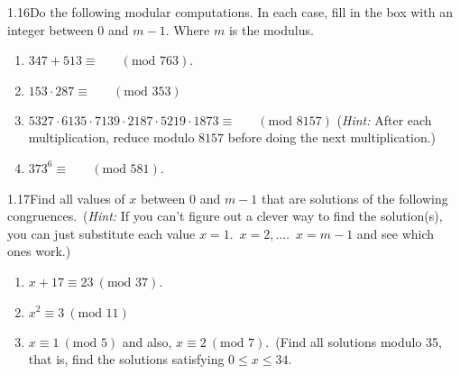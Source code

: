 \begin{exercise}
    {1.16}Do the following modular computations. In each case, fill in the box with an integer between 0 and \(m - 1\). Where \(m\) is the modulus.
    \begin{enumerate}
        \item \(347 + 513 \equiv \boxed{\phantom{000}} \ (\text{mod } 763)\).
        \setcounter{enumi}{2}
        \item \(153 \cdot 287 \equiv \boxed{\phantom{000}} \ (\text{mod } 353)\)
        \setcounter{enumi}{4}
        \item \(5327 \cdot 6135 \cdot 7139 \cdot 2187 \cdot 5219 \cdot 1873 \equiv \boxed{\phantom{000}} \ (\text{mod } 8157)\) (\textit{Hint:} After each multiplication, reduce modulo \(8157\) before doing the next multiplication.)
        \setcounter{enumi}{6}
        \item \(373^6 \equiv \boxed{\phantom{000}} \ (\text{mod } 581)\).
    \end{enumerate}
\end{exercise}


\begin{exercise}
    {1.17}Find all values of \(x\) between \(0\) and \(m - 1\) that are solutions of the following congruences.\ (\textit{Hint:} If you can't figure out a clever way to find the solution(s), you can just substitute each value \(x = 1\).\ \(x = 2,\dots\).\ \(x = m - 1\) and see which ones work.)
    \begin{enumerate}
        \item \(x + 17 \equiv 23 \ (\text{mod } 37)\).
        \setcounter{enumi}{2}
        \item \(x^2 \equiv 3 \ (\text{mod } 11)\)
        \setcounter{enumi}{6}
        \item \(x \equiv 1 \ (\text{mod } 5)\) and also, \(x \equiv 2 \ (\text{mod } 7)\).\ (Find all solutions modulo 35, that is, find the solutions satisfying \(0 \leq x \leq 34\).
    \end{enumerate}
\end{exercise}

